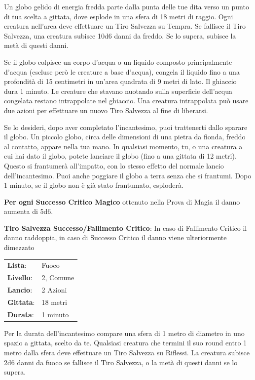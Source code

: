 \begin{multicols}{2}
Un globo gelido di energia fredda parte dalla punta delle tue dita verso un punto di tua scelta a gittata, dove esplode in una sfera di 18 metri di raggio. Ogni creatura nell'area deve effettuare un Tiro Salvezza su Tempra. Se fallisce il Tiro Salvezza, una creatura subisce 10d6 danni da freddo. Se lo supera, subisce la metà di questi danni.

Se il globo colpisce un corpo d'acqua o un liquido composto principalmente d'acqua (escluse però le creature a base d'acqua), congela il liquido fino a una profondità di 15 centimetri in un'area quadrata di 9 metri di lato. Il ghiaccio dura 1 minuto. Le creature che stavano nuotando sulla superficie dell'acqua congelata restano intrappolate nel ghiaccio. Una creatura intrappolata può usare due azioni per effettuare un nuovo Tiro Salvezza al fine di liberarsi.

Se lo desideri, dopo aver completato l'incantesimo, puoi trattenerti dallo sparare il globo. Un piccolo globo, circa delle dimensioni di una pietra da fionda, freddo al contatto, appare nella tua mano. In qualsiasi momento, tu, o una creatura a cui hai dato il globo, potete lanciare il globo (fino a una gittata di 12 metri). Questo si frantumerà all'impatto, con lo stesso effetto del normale lancio dell'incantesimo. Puoi anche poggiare il globo a terra senza che si frantumi. Dopo 1 minuto, se il globo non è già stato frantumato, esploderà.

\textbf{Per ogni Successo Critico Magico} ottenuto nella Prova di Magia il danno aumenta di 5d6.

\textbf{Tiro Salvezza Successo/Fallimento Critico}: In caso di Fallimento Critico il danno raddoppia, in caso di Successo Critico il danno viene ulteriormente dimezzato

\noindent\begin{tabularx}{\linewidth}{p{1.3cm}X}
	\rowcolor{gray!20}\textbf{Lista}: & Fuoco \\
	\textbf{Livello}: & 2, Comune \\
	\rowcolor{gray!20}\textbf{Lancio}: & 2 Azioni \\
	\textbf{Gittata}: & 18 metri \\
	\rowcolor{gray!20}\textbf{Durata}: & 1 minuto \\
\end{tabularx}\smallskip

Per la durata dell'incantesimo compare una sfera di 1 metro di diametro in uno spazio a gittata, scelto da te. Qualsiasi creatura che termini il suo round entro 1 metro dalla sfera deve effettuare un Tiro Salvezza su Riflessi. La creatura subisce 2d6 danni da fuoco se fallisce il Tiro Salvezza, o la metà di questi danni se lo supera.


\end{multicols}
